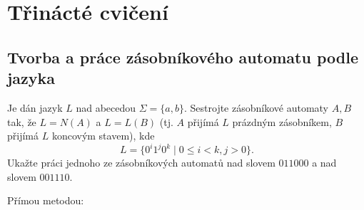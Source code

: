 \setlength{\abovedisplayskip}{0pt}
\setlength{\belowdisplayskip}{0pt}
\setlength{\abovedisplayshortskip}{0pt}
\setlength{\belowdisplayshortskip}{0pt}

\section{Třinácté cvičení}

\subsection{Tvorba a práce zásobníkového automatu podle jazyka}
Je dán jazyk $L$ nad abecedou $\Sigma = \{a,b\}$. Sestrojte zásobníkové automaty $A,B$ tak, že $L = N(A)$ a $L = L(B)$
(tj. $A$ přijímá $L$ prázdným zásobníkem, $B$ přijímá $L$ koncovým stavem), kde
\[L = \{0^i 1^j 0^k \mid 0 \leq i < k, j > 0\}\text{.}\]
Ukažte práci jednoho ze zásobníkových automatů nad slovem $011000$ a nad slovem $001110$.

Přímou metodou:

